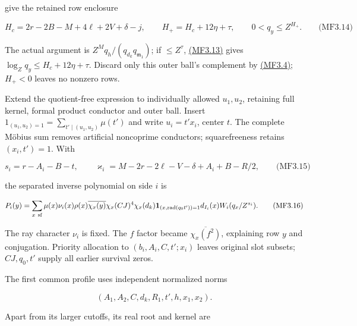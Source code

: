 give the retained row enclosure

\hypertarget{mf:eq:B3.14}{}

\label{mf:eq:B3.14}

\[
H_c=2r-2B-M+4\ell+2V+\delta-j,
\qquad H_+=H_c+12\eta+\tau,
\qquad 0<q_y\le Z^{H_+}.
\qquad\text{(MF3.14)}
\]

The actual argument is \(Z^Mq_h/(q_{d_k}q_{\mathfrak m_1})\); if \(\le Z^\tau\), \protect\hyperlink{mf:eq:B3.13}{(MF3.13)} gives \(\log_Zq_y\le H_c+12\eta+\tau\). Discard only this outer ball's complement by \protect\hyperlink{mf:eq:B3.4}{(MF3.4)}; \(H_+<0\) leaves no nonzero rows.

Extend the quotient-free expression to individually allowed \(u_1,u_2\), retaining full kernel, formal product conductor and outer ball. Insert \(1_{(u_1,u_2)=1}=\sum_{t'\mid(u_1,u_2)}\mu(t')\) and write \(u_i=t'x_i\), center \(t\). The complete Möbius sum removes artificial noncoprime conductors; squarefreeness retains \((x_i,t')=1\). With

\hypertarget{mf:eq:B3.15}{}

\label{mf:eq:B3.15}

\[
s_i=r-A_i-B-t,\qquad
\varkappa_i=M-2r-2\ell-V-\delta+A_i+B-R/2,
\qquad\text{(MF3.15)}
\]

the separated inverse polynomial on side \(i\) is

\hypertarget{mf:eq:B3.16}{}

\label{mf:eq:B3.16}

\[
P_i(y)=\sum_{x\ {\rm sf}}\mu(x)\nu_i(x)\rho(x)
 \overline{\chi_x(y)}\chi_x(CJ)^4\chi_x(d_k)
 \mathbf1_{(x,\operatorname{rad}(q_0t'))=1}d_{I_i}(x)W_i(q_x/Z^{s_i}).
\qquad\text{(MF3.16)}
\]

The ray character \(\nu_i\) is fixed. The \(f\) factor became \(\overline{\chi_x(f^2)}\), explaining row \(y\) and conjugation. Priority allocation to \((b_i,A_i,C,t';x_i)\) leaves original slot subsets; \(CJ,q_0,t'\) supply all earlier survival zeros.

The first common profile uses independent normalized norms

\[
(A_1,A_2,C,d_k,R_1,t',h,x_1,x_2).
\]

Apart from its larger cutoffs, its real root and kernel are

\hypertarget{mf:eq:B3.17}{}

\label{mf:eq:B3.17}

\par\noindent\resizebox{\linewidth}{!}{\begin{minipage}{\dimexpr\linewidth+82.78163pt\relax}\[
y_d^{-1}y_R^{-1/2}y_t^{-1}(y_1y_2)^{-1/2}
 W(y_{A_1}y_Cy_ty_1)\overline{W(y_{A_2}y_Cy_ty_2)}
 K_1\!\left(A_1^{\rm ker}\frac{y_h}{y_dy_Ry_t^2y_1y_2}\right),
\quad A_1^{\rm ker}=Z^{M+h_1-\delta-R-2t-s_1-s_2},
\qquad\text{(MF3.17)}
\]\end{minipage}}\par

